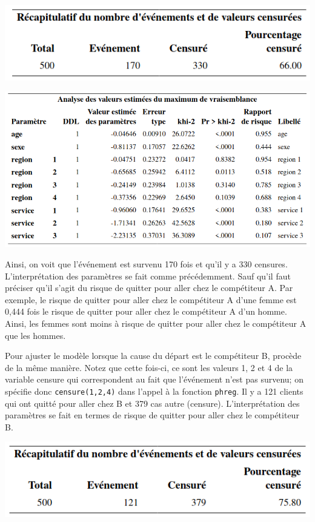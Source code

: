 \documentclass[
  11pt,
  letterpaper,
]{book}
\theoremstyle{definition}
\theoremstyle{definition}
\theoremstyle{definition}
\theoremstyle{remark}
\begin{document}
\begin{center}\includegraphics[width=0.65\linewidth]{figures/05-survie-e24} \end{center}

\begin{center}\includegraphics[width=0.85\linewidth]{figures/05-survie-e25} \end{center}

Ainsi, on voit que l'événement est survenu 170 fois et qu'il y a 330 censures. L'interprétation des paramètres se fait comme précédemment. Sauf qu'il faut préciser qu'il s'agit du risque de quitter pour aller chez le compétiteur A. Par exemple, le risque de quitter pour aller chez le compétiteur A d'une femme est 0,444 fois le risque de quitter pour aller chez le compétiteur A d'un homme. Ainsi, les femmes sont moins à risque de quitter pour aller chez le compétiteur A que les hommes.

Pour ajuster le modèle lorsque la cause du départ est le compétiteur B, procède de la même manière. Notez que cette fois-ci, ce sont les valeurs 1, 2 et 4 de la variable censure qui correspondent au fait que l'événement n'est pas survenu; on spécifie donc \texttt{censure(1,2,4)} dans l'appel à la fonction \texttt{phreg}. Il y a 121 clients qui ont quitté pour aller chez B et 379 cas autre (censure). L'interprétation des paramètres se fait en termes de risque de quitter pour aller chez le compétiteur B.

\begin{center}\includegraphics[width=0.65\linewidth]{figures/05-survie-e26} \end{center}
\end{document}
